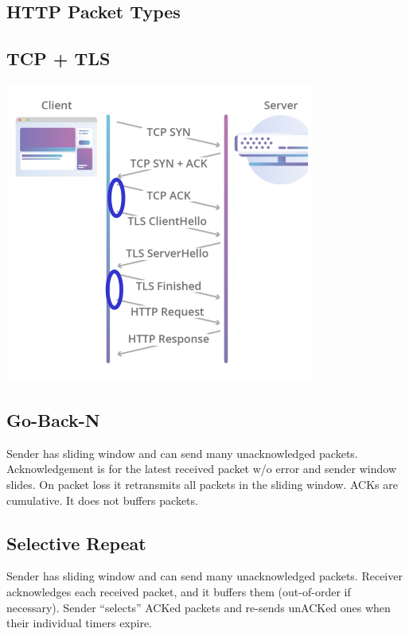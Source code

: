\subsection*{HTTP Packet Types}
\subsection*{TCP + TLS}
\begin{center}
  \includegraphics[scale=0.4]{images/tcp-n-tls.png}
\end{center}
\subsection*{Go-Back-N}
Sender has sliding window and can send many unacknowledged packets.
Acknowledgement is for the latest received packet w/o error and sender
window slides. On packet loss it retransmits all packets in the sliding
window. ACKs are cumulative. It does not buffers packets.
\subsection*{Selective Repeat}
Sender has sliding window and can send many unacknowledged packets.
Receiver acknowledges each received packet, and it buffers them
(out-of-order if necessary). Sender ``selects'' ACKed packets and re-sends
unACKed ones when their individual timers expire.